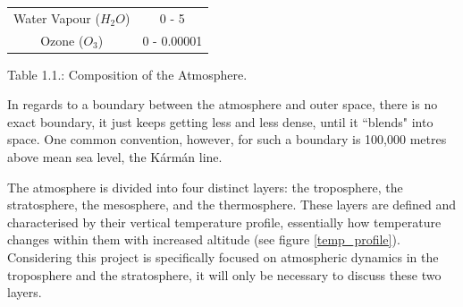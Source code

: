 \begin{center}
\begin{tabular}{c c} 
 Water Vapour ($H_{2}O$) & 0 - 5 \\
 Ozone ($O_3$) & 0 - 0.00001 \\
 \hline
\end{tabular}\par
\bigskip
Table 1.1.: Composition of the Atmosphere.
\end{center}

In regards to a boundary between the atmosphere and outer space, there is no exact boundary, it just keeps getting less and less dense, until it ``blends" into space. One common convention, however, for such a boundary is 100,000 metres above mean sea level, the Kármán line\cite{simonclark}.


The atmosphere is divided into four distinct layers: the troposphere, the stratosphere, the mesosphere, and the thermosphere. These layers are defined and  characterised by their vertical temperature profile, essentially how temperature changes within them with increased altitude (see figure \ref{temp_profile}). Considering this project is specifically focused on atmospheric dynamics in the troposphere and the stratosphere, it will only be necessary to discuss these two layers. 


